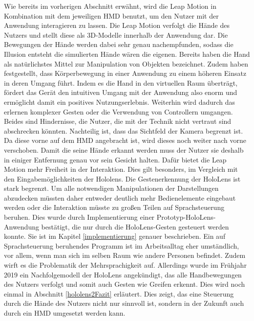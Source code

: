 Wie bereits im vorherigen Abschnitt erwähnt, wird die Leap Motion in Kombination mit dem jeweiligen HMD benutzt, um den Nutzer mit der Anwendung interagieren zu lassen. 
Die Leap Motion verfolgt die Hände des Nutzers und stellt diese als 3D-Modelle innerhalb der Anwendung dar. Die Bewegungen der Hände werden dabei sehr genau nachempfunden, sodass die Illusion entsteht die simulierten Hände wären die eigenen. 
Bereits \cite{Zimmerman86} haben die Hand als natürlichstes Mittel zur Manipulation von Objekten bezeichnet. Zudem haben \cite{Bianchi-Berthouze07} festgestellt, dass Körperbewegung in einer Anwendung zu einem höheren Einsatz in deren Umgang führt. Indem es die Hand in den virtuellen Raum überträgt, fördert das Gerät den intuitiven Umgang mit der Anwendung also enorm und ermöglicht damit ein positives Nutzungserlebnis. Weiterhin wird dadurch das erlernen komplexer Gesten oder die Verwendung von Controllern umgangen. Beides sind Hindernisse, die Nutzer, die mit der Technik nicht vertraut sind abschrecken könnten. 
Nachteilig ist, dass das Sichtfeld der Kamera begrenzt ist. Da diese vorne auf dem HMD angebracht ist, wird dieses noch weiter nach vorne verschoben. Damit die seine Hände erkannt werden muss der Nutzer sie deshalb in einiger Entfernung genau vor sein Gesicht halten. 
Dafür bietet die Leap Motion mehr Freiheit in der Interaktion. Dies gilt besonders, im Vergleich mit den Eingabemöglichkeiten der Hololens. 
Die Gestenerkennung der HoloLens ist stark begrenzt. Um alle notwendigen Manipulationen der Darstellungen abzudecken müssten daher entweder deutlich mehr Bedienelemente eingebaut werden oder die Interaktion müsste zu großen Teilen auf Sprachsteuerung beruhen. 
Dies wurde durch Implementierung einer Prototyp-HoloLens-Anwendung bestätigt, die nur durch die HoloLens-Gesten gesteuert werden konnte. Sie ist im Kapitel \ref{implementierung} genauer beschrieben.
Ein auf Sprachsteuerung beruhendes Programm ist im Arbeitsalltag eher umständlich, vor allem, wenn man sich im selben Raum wie andere Personen befindet. Zudem wirft es die Problematik der Mehrsprachigkeit auf. 
Allerdings wurde im Frühjahr 2019 ein Nachfolgemodell der HoloLens angekündigt, das alle Handbewegungen des Nutzers verfolgt und somit auch Gesten wie Greifen erkennt. Dies wird noch einmal in Abschnitt \ref{hololens2Fazit} erläutert. Dies zeigt, das eine Steuerung durch die Hände des Nutzers nicht nur sinnvoll ist, sondern in der Zukunft auch durch ein HMD umgesetzt werden kann.

